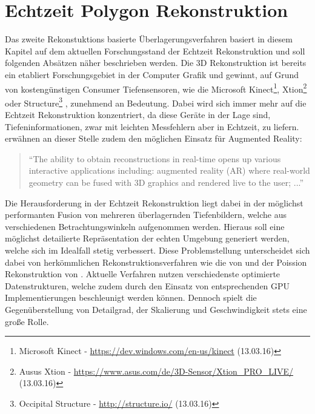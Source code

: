 \section{Echtzeit Polygon Rekonstruktion} \label{sec:polygon_reconstruction}

Das zweite Rekonstuktions basierte Überlagerungsverfahren basiert in diesem Kapitel auf dem aktuellen Forschungsstand der Echtzeit Rekonstruktion und soll folgenden Absätzen näher beschrieben werden. Die 3D Rekonstruktion ist bereits ein etabliert Forschungsgebiet in der Computer Grafik und gewinnt, auf Grund von kostengünstigen Consumer Tiefensensoren, wie die Microsoft Kinect\footnote{Microsoft Kinect - \url{https://dev.windows.com/en-us/kinect} (13.03.16)}, Xtion\footnote{Ausus Xtion - \url{https://www.asus.com/de/3D-Sensor/Xtion_PRO_LIVE/} (13.03.16)} oder Structure\footnote{Occipital Structure - \url{http://structure.io/} (13.03.16)} , zunehmend an Bedeutung. Dabei wird sich immer mehr auf die Echtzeit Rekonstruktion konzentriert, da diese Geräte in der Lage sind, Tiefeninformationen, zwar mit leichten Messfehlern aber in Echtzeit, zu liefern. \citet{niessner2013real} erwähnen an dieser Stelle zudem den möglichen Einsatz für Augmented Reality:

\begin{quote}
\enquote{The ability to obtain reconstructions
in real-time opens up various interactive applications including:
augmented reality (AR) where real-world geometry can be fused
with 3D graphics and rendered live to the user; ...} \citep{niessner2013real}
\end{quote}

Die Herausforderung in der Echtzeit Rekonstruktion liegt dabei in der möglichst performanten Fusion von mehreren überlagernden Tiefenbildern, welche aus verschiedenen Betrachtungswinkeln aufgenommen werden. Hieraus soll eine möglichst detailierte Repräsentation der echten Umgebung generiert werden, welche sich im Idealfall stetig verbessert. Diese Problemstellung unterscheidet sich dabei von herkömmlichen Rekonstruktionsverfahren wie die von \citet{hoppe1992surface} und der Poission Rekonstruktion von \citet{kazhdan2006poisson}. Aktuelle Verfahren nutzen verschiedenste optimierte Datenstrukturen, welche zudem durch den Einsatz von entsprechenden GPU Implementierungen beschleunigt werden können. Dennoch spielt die Gegenüberstellung von Detailgrad, der Skalierung und Geschwindigkeit stets eine große Rolle. \citep{niessner2013real} 

